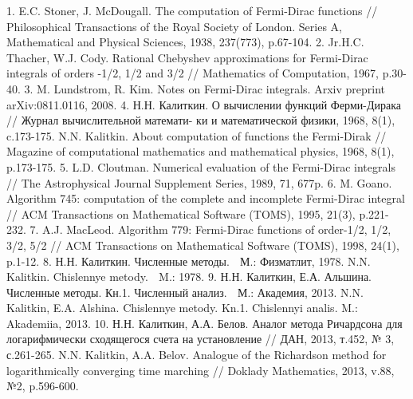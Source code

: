 1. E.C. Stoner, J. McDougall. The computation of Fermi-Dirac functions // Philosophical Transactions of
the Royal Society of London. Series A, Mathematical and Physical Sciences, 1938, 237(773), p.67-104.
2. Jr.H.C. Thacher, W.J. Cody. Rational Chebyshev approximations for Fermi-Dirac integrals of orders
-1/2, 1/2 and 3/2 // Mathematics of Computation, 1967, p.30-40.
3. M. Lundstrom, R. Kim. Notes on Fermi-Dirac integrals. Arxiv preprint arXiv:0811.0116, 2008.
4. Н.Н. Калиткин. О вычислении функций Ферми-Дирака // Журнал вычислительной математи-
ки и математической физики, 1968, 8(1), c.173-175.
N.N. Kalitkin. About computation of functions the Fermi-Dirak // Magazine of computational mathematics
and mathematical physics, 1968, 8(1), p.173-175.
5. L.D. Cloutman. Numerical evaluation of the Fermi-Dirac integrals // The Astrophysical Journal
Supplement Series, 1989, 71, 677p.
6. M. Goano. Algorithm 745: computation of the complete and incomplete Fermi-Dirac integral //
ACM Transactions on Mathematical Software (TOMS), 1995, 21(3), p.221-232.
7. A.J. MacLeod. Algorithm 779: Fermi-Dirac functions of order-1/2, 1/2, 3/2, 5/2 // ACM Transactions
on Mathematical Software (TOMS), 1998, 24(1), p.1-12.
8. Н.Н. Калиткин. Численные методы.  М.: Физматлит, 1978.
N.N. Kalitkin. Chislennye metody.  M.: 1978.
9. Н.Н. Калиткин, Е.А. Альшина. Численные методы. Кн.1. Численный анализ.  М.: Академия, 2013.
N.N. Kalitkin, E.A. Alshina. Chislennye metody. Kn.1. Chislennyi analis. M.: Akademiia, 2013.
10. Н.Н. Калиткин, А.А. Белов. Аналог метода Ричардсона для логарифмически сходящегося
счета на установление // ДАН, 2013, т.452, № 3, с.261-265.
N.N. Kalitkin, A.A. Belov. Analogue of the Richardson method for logarithmically converging time
marching // Doklady Mathematics, 2013, v.88, №2, p.596-600.


